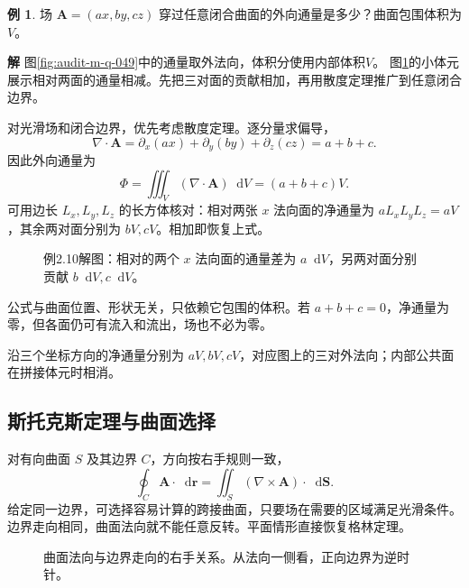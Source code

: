 \documentclass[11pt,openany,fontset=fandol]{ctexbook}
\theoremstyle{plain}\newtheorem{theorem}{定理}[chapter]\newtheorem{proposition}[theorem]{命题}
\theoremstyle{definition}\newtheorem{definition}{定义}[chapter]\newtheorem{example}{例}[chapter]
\theoremstyle{remark}\newtheorem*{remark}{说明}
\newcommand{\SolutionStart}{\par\nobreak\medskip\nobreak\noindent\textbf{解}\quad\ignorespaces}
\newenvironment{solution}{\SolutionStart}{\par\medskip}
\newcommand{\dd}{\mathop{}\!\mathrm d}\newcommand{\ii}{\mathrm i}\newcommand{\ee}{\mathrm e}
\newcommand{\vct}[1]{\bm{#1}}\newcommand{\Rea}{\operatorname{Re}}\newcommand{\Ima}{\operatorname{Im}}
\begin{document}
\begin{example}
场 $\vct A=(ax,by,cz)$ 穿过任意闭合曲面的外向通量是多少？曲面包围体积为 $V$。
\end{example}

\begin{solution}
图\ref{fig:audit-m-q-049}中的通量取外法向，体积分使用内部体积$V$。
图\ref{fig:eg-2-10}的小体元展示相对两面的通量相减。先把三对面的贡献相加，再用散度定理推广到任意闭合边界。

对光滑场和闭合边界，优先考虑散度定理。逐分量求偏导，
\[
\nabla\cdot\vct A=\partial_x(ax)+\partial_y(by)+\partial_z(cz)=a+b+c.
\]
因此外向通量为
\[
\Phi=\iiint_V(\nabla\cdot\vct A)\dd V=(a+b+c)V.
\]
可用边长 $L_x,L_y,L_z$ 的长方体核对：相对两张 $x$ 法向面的净通量为 $aL_xL_yL_z=aV$，其余两对面分别为 $bV,cV$。相加即恢复上式。

\begin{figure}[H]\centering
{}
\caption{例2.10解图：相对的两个 $x$ 法向面的通量差为 $a\dd V$，另两对面分别贡献 $b\dd V,c\dd V$。}
\label{fig:eg-2-10}
\end{figure}

公式与曲面位置、形状无关，只依赖它包围的体积。若 $a+b+c=0$，净通量为零，但各面仍可有流入和流出，场也不必为零。

沿三个坐标方向的净通量分别为 $aV,bV,cV$，对应图上的三对外法向；内部公共面在拼接体元时相消。
\end{solution}

\subsection{斯托克斯定理与曲面选择}
对有向曲面 $S$ 及其边界 $C$，方向按右手规则一致，
\[
\oint_C\vct A\cdot\dd\vct r=\iint_S(\nabla\times\vct A)\cdot\dd\vct S.
\]
给定同一边界，可选择容易计算的跨接曲面，只要场在需要的区域满足光滑条件。边界走向相同，曲面法向就不能任意反转。平面情形直接恢复格林定理。
\begin{figure}[htbp]\centering
{}
\caption{曲面法向与边界走向的右手关系。从法向一侧看，正向边界为逆时针。}
\label{fig:orig-040}
\end{figure}
\end{document}
